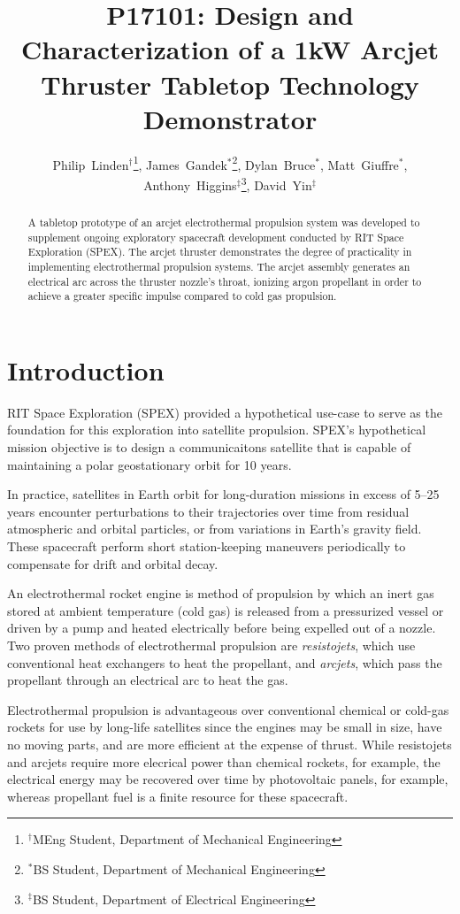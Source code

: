 \documentclass[journal]{IEEEtran}
\title{P17101: Design and Characterization of a 1kW Arcjet Thruster Tabletop Technology Demonstrator}
\author{
  Philip~Linden$^{\dagger}$\thanks{$^{\dagger}$MEng Student, Department of Mechanical Engineering},
  James~Gandek$^{*}$\thanks{$^{*}$BS Student, Department of Mechanical Engineering},
  Dylan~Bruce$^{*}$,
  Matt~Giuffre$^{*}$,
  Anthony~Higgins$^{\ddagger}$\thanks{$^{\ddagger}$BS Student, Department of Electrical Engineering},
  David~Yin$^{\ddagger}$
}
\begin{document}
\maketitle

\begin{abstract}
A tabletop prototype of an arcjet electrothermal propulsion system was developed to supplement ongoing exploratory spacecraft development conducted by RIT Space Exploration (SPEX). The arcjet thruster demonstrates the degree of practicality in implementing electrothermal propulsion systems. The arcjet assembly generates an electrical arc across the thruster nozzle's throat, ionizing argon propellant in order to achieve a greater specific impulse compared to cold gas propulsion.
\end{abstract}

\label{sec:nomenclature}
\printnomenclature{}

\section{Introduction}
\label{sec:intro}
RIT Space Exploration (SPEX) provided a hypothetical use-case to serve as the foundation for this exploration into satellite propulsion.
SPEX's hypothetical mission objective is to design a communicaitons satellite that is capable of maintaining a polar geostationary orbit for 10 years.

In practice, satellites in Earth orbit for long-duration missions in excess of 5--25 years encounter perturbations to their trajectories over time from residual atmospheric and orbital particles, or from variations in Earth's gravity field.
These spacecraft perform short station-keeping maneuvers periodically to compensate for drift and orbital decay.

An electrothermal rocket engine is method of propulsion by which an inert gas stored at ambient temperature (cold gas) is released from a pressurized vessel or driven by a pump and heated electrically before being expelled out of a nozzle.
Two proven methods of electrothermal propulsion are \emph{resistojets}, which use conventional heat exchangers to heat the propellant, and \emph{arcjets}, which pass the propellant through an electrical arc to heat the gas.

Electrothermal propulsion is advantageous over conventional chemical or cold-gas rockets for use by long-life satellites since the engines may be small in size, have no moving parts, and are more efficient at the expense of thrust.
While resistojets and arcjets require more elecrical power than chemical rockets, for example, the electrical energy may be recovered over time by photovoltaic panels, for example, whereas propellant fuel is a finite resource for these spacecraft.
\end{document}
